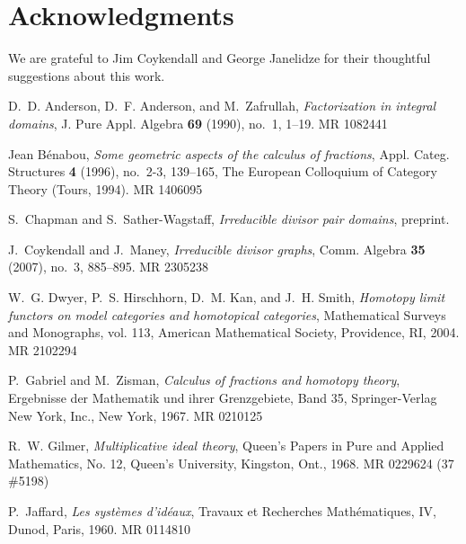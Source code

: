 \documentclass[reqno]{amsart}
\theoremstyle{plain}
\theoremstyle{definition}
\numberwithin{equation}{lem}
\begin{document}
\section*{Acknowledgments}
We are grateful to Jim Coykendall 
and George Janelidze
for their thoughtful suggestions about this work.

%
\providecommand{\bysame}{\leavevmode\hbox to3em{\hrulefill}\thinspace}
\providecommand{\MR}{\relax\ifhmode\unskip\space\fi MR }
\providecommand{\MRhref}[2]{%
  \href{http://www.ams.org/mathscinet-getitem?mr=#1}{#2}
}
\providecommand{\href}[2]{#2}
\begin{thebibliography}{10}

D.~D. Anderson, D.~F. Anderson, and M.~Zafrullah, \emph{Factorization in
  integral domains}, J. Pure Appl. Algebra \textbf{69} (1990), no.~1, 1--19.
  \MR{1082441}

Jean B\'{e}nabou, \emph{Some geometric aspects of the calculus of fractions},
  Appl. Categ. Structures \textbf{4} (1996), no.~2-3, 139--165, The European
  Colloquium of Category Theory (Tours, 1994). \MR{1406095}

S.~Chapman and S.~Sather-Wagstaff, \emph{Irreducible divisor pair domains},
  preprint.

J.~Coykendall and J.~Maney, \emph{Irreducible divisor graphs}, Comm. Algebra
  \textbf{35} (2007), no.~3, 885--895. \MR{2305238}

W.~G. Dwyer, P.~S. Hirschhorn, D.~M. Kan, and J.~H. Smith, \emph{Homotopy limit
  functors on model categories and homotopical categories}, Mathematical
  Surveys and Monographs, vol. 113, American Mathematical Society, Providence,
  RI, 2004. \MR{2102294}

P.~Gabriel and M.~Zisman, \emph{Calculus of fractions and homotopy theory},
  Ergebnisse der Mathematik und ihrer Grenzgebiete, Band 35, Springer-Verlag
  New York, Inc., New York, 1967. \MR{0210125}

R.~W. Gilmer, \emph{Multiplicative ideal theory}, Queen's Papers in Pure and
  Applied Mathematics, No. 12, Queen's University, Kingston, Ont., 1968.
  \MR{0229624 (37 \#5198)}

P.~Jaffard, \emph{Les syst\`emes d'id\'eaux}, Travaux et Recherches
  Math\'ematiques, IV, Dunod, Paris, 1960. \MR{0114810}


\end{thebibliography}
\end{document}
